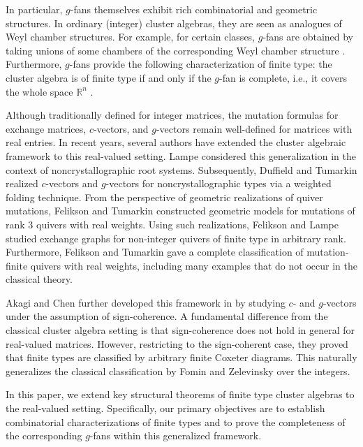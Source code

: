 \documentclass[11pt,reqno]{amsart}
\numberwithin{equation}{section}
\theoremstyle{definition}
\theoremstyle{plain}
\begin{document}
  In particular, $g$-fans themselves exhibit rich combinatorial and geometric structures. In ordinary (integer) cluster algebras, they are seen as analogues of Weyl chamber structures. For example, for certain classes, $g$-fans are obtained by taking unions of some chambers of the corresponding Weyl chamber structure \cite{RS16, RS18}. Furthermore, $g$-fans provide the following characterization of finite type: the cluster algebra is of finite type if and only if the $g$-fan is complete, i.e., it covers the whole space $\mathbb{R}^n$ \cite{N26,Y25}.
	
	Although traditionally defined for integer matrices, the mutation formulas for exchange matrices, $c$-vectors, and $g$-vectors remain well-defined for matrices with real entries. In recent years, several authors have extended the cluster algebraic framework to this real-valued setting. Lampe \cite{Lam18} considered this generalization in the context of noncrystallographic root systems. Subsequently, Duffield and Tumarkin \cite{DT24, DT25} realized $c$-vectors and $g$-vectors for noncrystallographic types via a weighted folding technique. From the perspective of geometric realizations of quiver mutations, Felikson and Tumarkin \cite{FT19} constructed geometric models for mutations of rank $3$ quivers with real weights. Using such realizations, Felikson and Lampe \cite{FL23} studied exchange graphs for non-integer quivers of finite type in arbitrary rank. Furthermore, Felikson and Tumarkin \cite{FT23} gave a complete classification of mutation-finite quivers with real weights, including many examples that do not occur in the classical theory.
	
	Akagi and Chen further developed this framework in \cite{AC25} by studying $c$- and $g$-vectors under the assumption of sign-coherence. A fundamental difference from the classical cluster algebra setting is that sign-coherence does not hold in general for real-valued matrices. However, restricting to the sign-coherent case, they proved that finite types are classified by arbitrary finite Coxeter diagrams. This naturally generalizes the classical classification by Fomin and Zelevinsky \cite{FZ03a} over the integers.
	
	In this paper, we extend key structural theorems of finite type cluster algebras to the real-valued setting. Specifically, our primary objectives are to establish combinatorial characterizations of finite types and to prove the completeness of the corresponding $g$-fans within this generalized framework.
	
\end{document}
